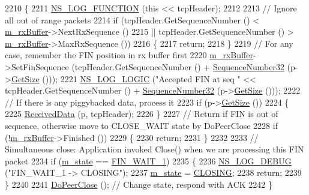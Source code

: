 \begin{DoxyCode}
2210 \{
2211   \hyperlink{log-macros-disabled_8h_a90b90d5bad1f39cb1b64923ea94c0761}{NS\_LOG\_FUNCTION} (\textcolor{keyword}{this} << tcpHeader);
2212 
2213   \textcolor{comment}{// Ignore all out of range packets}
2214   \textcolor{keywordflow}{if} (tcpHeader.GetSequenceNumber () < \hyperlink{classns3_1_1TcpSocketBase_a0163894148e5a70e6bd89970a1483fae}{m\_rxBuffer}->NextRxSequence ()
2215       || tcpHeader.GetSequenceNumber () > \hyperlink{classns3_1_1TcpSocketBase_a0163894148e5a70e6bd89970a1483fae}{m\_rxBuffer}->MaxRxSequence ())
2216     \{
2217       \textcolor{keywordflow}{return};
2218     \}
2219   \textcolor{comment}{// For any case, remember the FIN position in rx buffer first}
2220   \hyperlink{classns3_1_1TcpSocketBase_a0163894148e5a70e6bd89970a1483fae}{m\_rxBuffer}->SetFinSequence (tcpHeader.GetSequenceNumber () + 
      \hyperlink{group__network_gacb2070e4e98d2d5135c9bede58f07a03}{SequenceNumber32} (p->\hyperlink{classns3_1_1Packet_a462855c9929954d4301a4edfe55f4f1c}{GetSize} ()));
2221   \hyperlink{group__logging_ga88acd260151caf2db9c0fc84997f45ce}{NS\_LOG\_LOGIC} (\textcolor{stringliteral}{"Accepted FIN at seq "} << tcpHeader.GetSequenceNumber () + 
      \hyperlink{group__network_gacb2070e4e98d2d5135c9bede58f07a03}{SequenceNumber32} (p->\hyperlink{classns3_1_1Packet_a462855c9929954d4301a4edfe55f4f1c}{GetSize} ()));
2222   \textcolor{comment}{// If there is any piggybacked data, process it}
2223   \textcolor{keywordflow}{if} (p->\hyperlink{classns3_1_1Packet_a462855c9929954d4301a4edfe55f4f1c}{GetSize} ())
2224     \{
2225       \hyperlink{classns3_1_1TcpSocketBase_a479e1a8be1ee1b169f87e57a4dc6f73c}{ReceivedData} (p, tcpHeader);
2226     \}
2227   \textcolor{comment}{// Return if FIN is out of sequence, otherwise move to CLOSE\_WAIT state by DoPeerClose}
2228   \textcolor{keywordflow}{if} (!\hyperlink{classns3_1_1TcpSocketBase_a0163894148e5a70e6bd89970a1483fae}{m\_rxBuffer}->Finished ())
2229     \{
2230       \textcolor{keywordflow}{return};
2231     \}
2232 
2233   \textcolor{comment}{// Simultaneous close: Application invoked Close() when we are processing this FIN packet}
2234   \textcolor{keywordflow}{if} (\hyperlink{classns3_1_1TcpSocketBase_a5db6f29272f23546e23320c06a681f3e}{m\_state} == \hyperlink{group__tcp_gga3929cdb47bdf159657fa24054aa5ca03a9f54edeb0f23302ae1c36d433b587b02}{FIN\_WAIT\_1})
2235     \{
2236       \hyperlink{group__logging_ga413f1886406d49f59a6a0a89b77b4d0a}{NS\_LOG\_DEBUG} (\textcolor{stringliteral}{"FIN\_WAIT\_1 -> CLOSING"});
2237       \hyperlink{classns3_1_1TcpSocketBase_a5db6f29272f23546e23320c06a681f3e}{m\_state} = \hyperlink{group__tcp_gga3929cdb47bdf159657fa24054aa5ca03aed7b7568d5e6519d8ce40712445b533d}{CLOSING};
2238       \textcolor{keywordflow}{return};
2239     \}
2240 
2241   \hyperlink{classns3_1_1TcpSocketBase_a8a56cf4ab3b64d9f781ed1b1f63f51cd}{DoPeerClose} (); \textcolor{comment}{// Change state, respond with ACK}
2242 \}
\end{DoxyCode}


